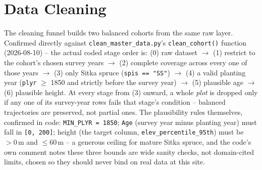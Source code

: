\section{Data Cleaning}
The cleaning funnel builds two balanced cohorts from the same raw layer.
Confirmed directly against \texttt{clean\_master\_data.py}'s \texttt{clean\_cohort()} function (2026-08-10) -- the actual coded stage order is: (0) raw dataset $\rightarrow$ (1) restrict to the cohort's chosen survey years $\rightarrow$ (2) complete coverage across every one of those years $\rightarrow$ (3) only Sitka spruce (\texttt{spis == "SS"}) $\rightarrow$ (4) a valid planting year (\texttt{plyr} $\ge$ 1850 and strictly before the survey year) $\rightarrow$ (5) plausible age $\rightarrow$ (6) plausible height.
At every stage from (3) onward, a whole \emph{plot} is dropped only if any one of its survey-year rows fails that stage's condition -- balanced trajectories are preserved, not partial ones.
The plausibility rules themselves, confirmed in code: \texttt{MIN\_PLYR = 1850}; \texttt{Age} (survey year minus planting year) must fall in \texttt{[0, 200]}; height (the target column, \texttt{elev\_percentile\_95th}) must be $>0$\,m and $\le 60$\,m -- a generous ceiling for mature Sitka spruce, and the code's own comment notes these three bounds are wide sanity checks, not domain-cited limits, chosen so they should never bind on real data at this site.


